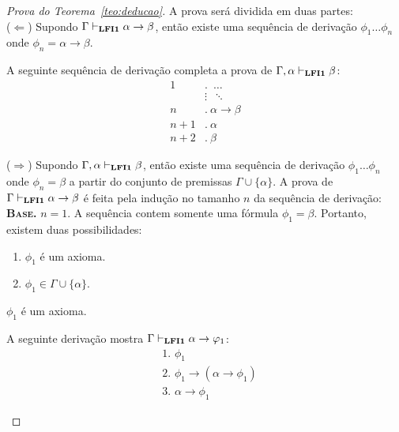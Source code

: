         \begin{proof}[Prova do Teorema~\ref{teo:deducao}] A prova será dividida em duas partes:\\
            ($\Longleftarrow$) Supondo $\Gamma \vdash_{{\normalfont\textbf{LFI1}}{}} \alpha \to \beta$, então existe uma sequência de derivação $\phi_{1} \ldots \phi_{n}$ onde $\phi_{n} = \alpha \to \beta$. 
            
            A seguinte sequência de derivação completa a prova de $\Gamma, \alpha \vdash_{{\normalfont\textbf{LFI1}}{}} \beta$:
            \begin{align*}
                \text{1}&.~ \; \ldots\\
                & \vdots \; ~\ddots\\
                \text{$n$}&.~ \alpha \to \beta\tag{Suposição}\\
                \text{$n + 1$}&.~ \alpha\tag{Premissa}\\
                \text{$n + 2$}&.~ \beta\tag{MP $n, n + 1$}
            \end{align*}

            \noindent  ($\Longrightarrow$) Supondo $\Gamma, \alpha \vdash_{{\normalfont\textbf{LFI1}}{}} \beta$, então existe uma sequência de derivação $\phi_{1} \ldots \phi_{n}$ onde $\phi_{n} = \beta$ a partir do conjunto de premissas $\Gamma \cup \{\alpha\}$. A prova de $\Gamma \vdash_{{\normalfont\textbf{LFI1}}{}} \alpha \to \beta$ é feita pela indução no tamanho $n$ da sequência de derivação:\\

            \noindent \textbf{\textsc{Base.}} $n = 1$.
            A sequência contem somente uma fórmula $\phi_{1} = \beta$. Portanto, existem duas possibilidades:
            \begin{enumerate}
                \item $\phi_{1}$ é um axioma.
                \item $\phi_{1} \in \Gamma \cup \{\alpha\}$.
            \end{enumerate}

            \begin{provaporcasos}
                \casodeprova{} $\phi_{1}$ é um axioma. 
                
                    A seguinte derivação mostra $\Gamma \vdash_{{\normalfont\textbf{LFI1}}{}} \alpha \to \varphi_{1}$:
                    \begin{align*}
                        & \text{1. } \phi_{1} \tag{Axioma}\\
                        & \text{2. } \phi_{1} \to (\alpha \to \phi_{1}) \tag{Ax1}\\
                        & \text{3. } \alpha \to \phi_{1} \tag{MP 1,2}
                    \end{align*}


\end{provaporcasos}
\end{proof}
